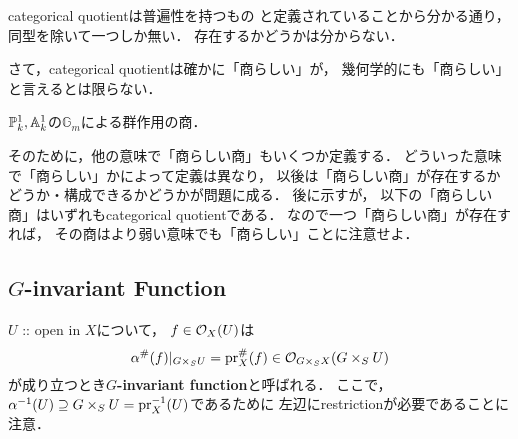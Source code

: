 \documentclass[a4paper]{jsarticle}
\newcommand{\Gm}{\mathbb{G}_m}
\begin{document}
    \begin{Remark}
        categorical quotientは普遍性を持つもの
        と定義されていることから分かる通り，
        同型を除いて一つしか無い．
        存在するかどうかは分からない．
    \end{Remark}

    さて，categorical quotientは確かに「商らしい」が，
    幾何学的にも「商らしい」と言えるとは限らない．

    \begin{Example}\label{example:P,A/Gm}
        $\mathbb{P}^1_k, \mathbb{A}^1_k$の$\Gm$による群作用の商．
    \end{Example}

    そのために，他の意味で「商らしい商」もいくつか定義する．
    どういった意味で「商らしい」かによって定義は異なり，
    以後は「商らしい商」が存在するかどうか・構成できるかどうかが問題に成る．
    後に示すが，
    以下の「商らしい商」はいずれもcategorical quotientである．
    なので一つ「商らしい商」が存在すれば，
    その商はより弱い意味でも「商らしい」ことに注意せよ．

    \subsection{\texorpdfstring{$G$}{G}-invariant Function}
    \begin{Def}[\cite{AV}]
        $U$ :: open in $X$について，
        $f \in \mathcal{O}_X(U)$は
        \[ \alpha^{\#}(f)|_{G \times_S U}=\operatorname{pr}_X^{\#}(f) \in \mathcal{O}_{G \times_S X}(G \times_S U) \]
        が成り立つとき\textbf{$G$-invariant function}と呼ばれる．
        ここで，
        $\alpha^{-1}(U) \supseteq G \times_S U=\operatorname{pr}_X^{-1}(U)$であるために
        左辺にrestrictionが必要であることに注意．
    \end{Def}
\end{document}
